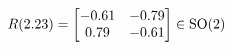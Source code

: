 \documentclass[preview]{standalone}
\begin{document}
\begin{align*}
\special{dvisvgm:raw <g id='unique000'>}R(2.23) = \begin{bmatrix} -0.61 & -0.79 \\ 0.79 & -0.61 \end{bmatrix} \in \text{SO}(2)\special{dvisvgm:raw </g>}
\end{align*}
\end{document}
